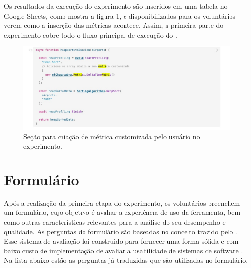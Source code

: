 \documentclass[12pt]{tcc}
\begin{document}
Os resultados da execução do experimento são inseridos em uma tabela no Google Sheets, como mostra a figura \ref{fig:experimento-tabela-resultado}, e disponibilizados para os voluntários verem como a inserção das métricas acontece. Assim, a primeira parte do experimento cobre todo o fluxo principal de execução do .

\begin{figure}[!ht]
	\centering
	\includegraphics[width=1\textwidth]{figures/experimento-heap.jpeg}
	\caption{Seção para criação de métrica customizada pelo usuário no experimento.}
	\label{fig:experimento-tabela-resultado}
\end{figure}


\section{Formulário}
\label{section:parte-2-formulario}

Após a realização da primeira etapa do experimento, os voluntários preenchem um formulário, cujo objetivo é avaliar a experiência de uso da ferramenta, bem como outras características relevantes para a análise do seu desempenho e qualidade. As perguntas do formulário são baseadas no conceito trazido pelo . Esse sistema de avaliação foi construido para fornecer uma forma sólida e com baixo custo de implementação de avaliar a usabilidade de sistemas de software \citep{brooke1995sus}. Na lista abaixo estão as perguntas já traduzidas que são utilizadas no formulário.
\end{document}
